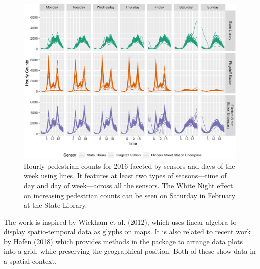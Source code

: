 \begin{Schunk}
\begin{figure}

{\centering \includegraphics[width=\textwidth]{figure/facet-time-1} 

}

\caption[Hourly pedestrian counts for 2016 faceted by sensors and days of the week using lines]{Hourly pedestrian counts for 2016 faceted by sensors and days of the week using lines. It features at least two types of seasons---time of day and day of week---across all the sensors. The White Night effect on increasing pedestrian counts can be seen on Saturday in February at the State Library.}\label{fig:facet-time}
\end{figure}
\end{Schunk}

The work is inspired by Wickham et al. (2012), which uses linear algebra
to display spatio-temporal data as glyphs on maps. It is also related to
recent work by Hafen (2018) which provides methods in the 
package to arrange data plots into a grid, while preserving the
geographical position. Both of these show data in a spatial context.


